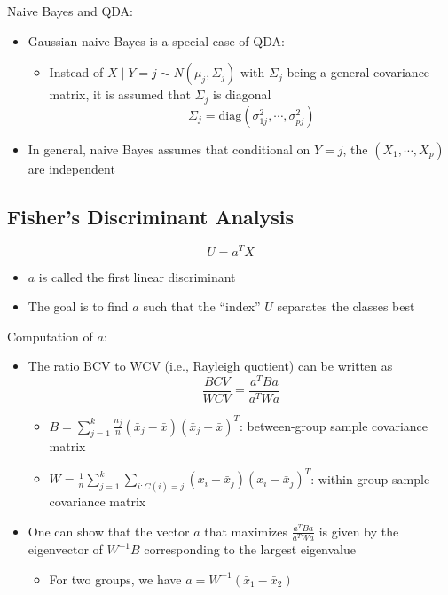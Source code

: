 \documentclass[a4paper]{article}
\begin{document}
Naive Bayes and QDA:
\begin{itemize}
    \item Gaussian naive Bayes is a special case of QDA:
    \begin{itemize}
        \item Instead of $X\mid Y=j \sim N(\mu_j,\Sigma_j)$ with $\Sigma_j$ being a general covariance matrix, it is assumed that $\Sigma_j$ is diagonal 
        \[\Sigma_j=\text{diag}(\sigma_{1j}^2,\cdots,\sigma_{pj}^2) \]
    \end{itemize}
    \item In general, naive Bayes assumes that conditional on $Y=j$, the $(X_1,\cdots,X_p)$ are independent
\end{itemize}

\subsection{Fisher's Discriminant Analysis}

\[U=a^TX \]
\begin{itemize}
    \item $a$ is called the first linear discriminant
    \item The goal is to find $a$ such that the ``index'' $U$ separates the classes best
\end{itemize}

Computation of $a$:
\begin{itemize}
    \item The ratio BCV to WCV (i.e., Rayleigh quotient) can be written as 
    \[\frac{BCV}{WCV}=\frac{a^TBa}{a^TWa} \]
    \begin{itemize}
        \item $B=\sum_{j=1}^{k}\frac{n_j}{n}(\bar{x}_j-\bar{x})(\bar{x}_j-\bar{x})^T$: between-group sample covariance matrix
        \item $W=\frac{1}{n}\sum_{j=1}^{k}\sum_{i:C(i)=j}(x_i-\bar{x}_j)(x_i-\bar{x}_j)^T$: within-group sample covariance matrix
    \end{itemize}
    \item One can show that the vector $a$ that maximizes $\frac{a^TBa}{a^TWa}$ is given by the eigenvector of $W^{-1}B$ corresponding to the largest eigenvalue
    \begin{itemize}
        \item For two groups, we have $a=W^{-1}(\bar{x}_1-\bar{x}_2)$
    \end{itemize}
\end{itemize}
\end{document}
